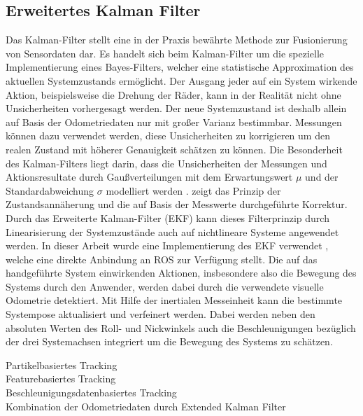 \subsection{Erweitertes Kalman Filter}
Das Kalman-Filter stellt eine in der Praxis bewährte Methode zur Fusionierung von Sensordaten dar. Es handelt sich beim Kalman-Filter \cite{Kalman1960} um die spezielle Implementierung eines Bayes-Filters, welcher eine statistische Approximation des aktuellen Systemzustands ermöglicht. Der Ausgang jeder auf ein System wirkende Aktion, beispielsweise die Drehung der Räder, kann in der Realität nicht ohne Unsicherheiten vorhergesagt werden. Der neue Systemzustand ist deshalb allein auf Basis der Odometriedaten nur mit großer Varianz bestimmbar. Messungen können dazu verwendet werden, diese Unsicherheiten zu korrigieren um den realen Zustand mit höherer Genauigkeit schätzen zu können. Die Besonderheit des Kalman-Filters liegt darin, dass die Unsicherheiten der Messungen und Aktionsresultate durch Gaußverteilungen mit dem Erwartungswert $\mu$ und der Standardabweichung $\sigma$ modelliert werden \cite{Hertzberg2012}.  zeigt das Prinzip der Zustandsannäherung und die auf Basis der Messwerte durchgeführte Korrektur. \\
Durch das Erweiterte Kalman-Filter (EKF) kann dieses Filterprinzip durch Linearisierung der Systemzustände auch auf nichtlineare Systeme angewendet werden. In dieser Arbeit wurde eine Implementierung des EKF verwendet \cite{EKF}, welche eine direkte Anbindung an ROS zur Verfügung stellt. Die auf das handgeführte System einwirkenden Aktionen, insbesondere also die Bewegung des Systems durch den Anwender, werden dabei durch die verwendete visuelle Odometrie detektiert. Mit Hilfe der inertialen Messeinheit kann die bestimmte Systempose aktualisiert und verfeinert werden. Dabei werden neben den absoluten Werten des Roll- und Nickwinkels auch die Beschleunigungen bezüglich der drei Systemachsen integriert um die Bewegung des Systems zu schätzen.


Partikelbasiertes Tracking\\
Featurebasiertes Tracking\\
Beschleunigungsdatenbasiertes Tracking\\
Kombination der Odometriedaten durch Extended Kalman Filter \\

